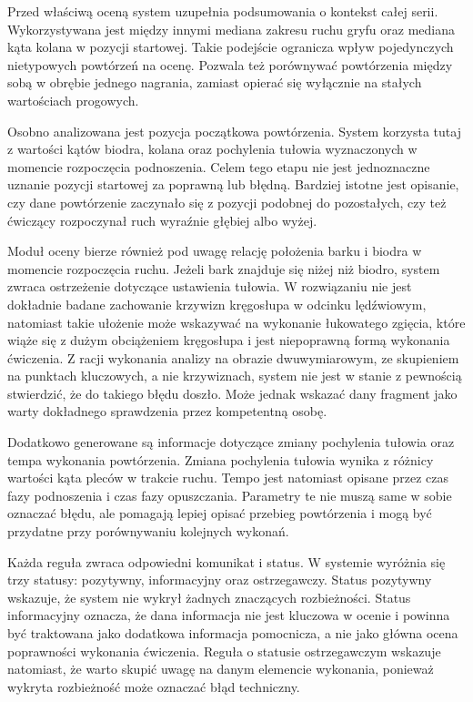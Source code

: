 Przed właściwą oceną system uzupełnia podsumowania o kontekst całej serii. Wykorzystywana jest między innymi mediana zakresu ruchu gryfu oraz mediana kąta kolana w pozycji startowej. Takie podejście ogranicza wpływ pojedynczych nietypowych powtórzeń na ocenę. Pozwala też porównywać powtórzenia między sobą w obrębie jednego nagrania, zamiast opierać się wyłącznie na stałych wartościach progowych.

Osobno analizowana jest pozycja początkowa powtórzenia. System korzysta tutaj z wartości kątów biodra, kolana oraz pochylenia tułowia wyznaczonych w momencie rozpoczęcia podnoszenia. Celem tego etapu nie jest jednoznaczne uznanie pozycji startowej za poprawną lub błędną. Bardziej istotne jest opisanie, czy dane powtórzenie zaczynało się z pozycji podobnej do pozostałych, czy też ćwiczący rozpoczynał ruch wyraźnie głębiej albo wyżej.

Moduł oceny bierze również pod uwagę relację położenia barku i biodra w momencie rozpoczęcia ruchu. Jeżeli bark znajduje się niżej niż biodro, system zwraca ostrzeżenie dotyczące ustawienia tułowia. W rozwiązaniu nie jest dokładnie badane zachowanie krzywizn kręgosłupa w odcinku lędźwiowym, natomiast takie ułożenie może wskazywać na wykonanie łukowatego zgięcia, które wiąże się z dużym obciążeniem kręgosłupa i jest niepoprawną formą wykonania ćwiczenia. Z racji wykonania analizy na obrazie dwuwymiarowym, ze skupieniem na punktach kluczowych, a nie krzywiznach, system nie jest w stanie z pewnością stwierdzić, że do takiego błędu doszło. Może jednak wskazać dany fragment jako warty dokładnego sprawdzenia przez kompetentną osobę.

Dodatkowo generowane są informacje dotyczące zmiany pochylenia tułowia oraz tempa wykonania powtórzenia. Zmiana pochylenia tułowia wynika z różnicy wartości kąta pleców w trakcie ruchu. Tempo jest natomiast opisane przez czas fazy podnoszenia i czas fazy opuszczania. Parametry te nie muszą same w sobie oznaczać błędu, ale pomagają lepiej opisać przebieg powtórzenia i mogą być przydatne przy porównywaniu kolejnych wykonań.

Każda reguła zwraca odpowiedni komunikat i status. W systemie wyróżnia się trzy statusy: pozytywny, informacyjny oraz ostrzegawczy. Status pozytywny wskazuje, że system nie wykrył żadnych znaczących rozbieżności. Status informacyjny oznacza, że dana informacja nie jest kluczowa w ocenie i powinna być traktowana jako dodatkowa informacja pomocnicza, a nie jako główna ocena poprawności wykonania ćwiczenia. Reguła o statusie ostrzegawczym wskazuje natomiast, że warto skupić uwagę na danym elemencie wykonania, ponieważ wykryta rozbieżność może oznaczać błąd techniczny.

